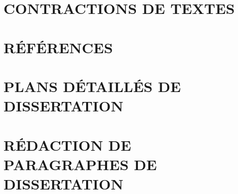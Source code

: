 \documentclass[openany, oneside, a4paper, 12pt]{book}
\begin{document}
\chapter{CONTRACTIONS DE TEXTES}
\newpage 

\chapter{R\'EF\'ERENCES}
\newpage 

\chapter{PLANS D\'ETAILL\'ES DE DISSERTATION}
%
%
%
%
%
%
%
%
%
%
%
%
%
%
%
%
%
%
%

%
%
%
%
%
%
%
%
%

\chapter{R\'EDACTION DE PARAGRAPHES DE DISSERTATION}
\newpage 


\end{document}
